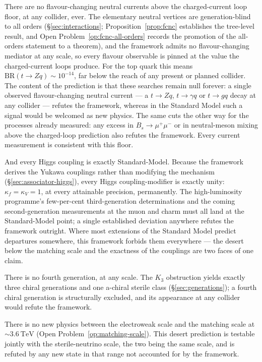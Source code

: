 There are no flavour-changing neutral currents above the charged-current loop floor, at any collider,
ever. The elementary neutral vertices are generation-blind to all orders (\S\ref{sec:interactions};
Proposition~\ref{prop:fcnc} establishes the tree-level result, and
Open Problem~\ref{op:fcnc-all-orders} records the promotion of the all-orders statement to a
theorem), and the framework admits no flavour-changing mediator at any scale, so every flavour
observable is pinned at the value the charged-current loops produce. For the top quark this means
$\mathrm{BR}(t\to Zq)\sim 10^{-14}$, far below the reach of any present or planned collider. The
content of the prediction is that these searches remain null forever: a single observed
flavour-changing neutral current --- a $t\to Zq$, $t\to\gamma q$ or $t\to gq$ decay at any collider
--- refutes the framework, whereas in the Standard Model such a signal would be welcomed as new
physics. The same cuts the other way for the processes already measured: any excess in
$B_s\to\mu^+\mu^-$ or in neutral-meson mixing above the charged-loop prediction also refutes the
framework. Every current measurement is consistent with this floor.

And every Higgs coupling is exactly Standard-Model. Because the framework derives the Yukawa
couplings rather than modifying the mechanism (\S\ref{sec:associator-higgs}), every Higgs
coupling-modifier is exactly unity: $\kappa_f = \kappa_V = 1$, at every attainable precision,
permanently. The high-luminosity programme's few-per-cent third-generation determinations and the
coming second-generation measurements at the muon and charm \autocite{cepeda2019hllhc} must all
land at the Standard-Model point; a single established deviation anywhere refutes the framework
outright. Where most extensions of the Standard Model predict departures somewhere, this framework
forbids them everywhere --- the desert below the matching scale and the exactness of the couplings
are two faces of one claim.

There is no fourth generation, at any scale. The $K_3$ obstruction yields exactly three chiral
generations and one a-chiral sterile class (\S\ref{sec:generations}); a fourth chiral generation is
structurally excluded, and its appearance at any collider would refute the framework.

There is no new physics between the electroweak scale and the matching scale at
$\sim 3.6\ \mathrm{TeV}$ (Open Problem~\ref{op:matching-scale}). This desert prediction is testable
jointly with the sterile-neutrino scale, the two being the same scale, and is refuted by any new
state in that range not accounted for by the framework.

